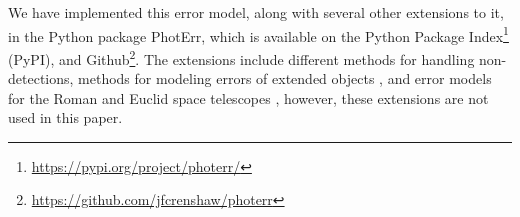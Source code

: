 \documentclass[twocolumn]{aastex631}
\begin{document}
We have implemented this error model, along with several other extensions to it, in the Python package PhotErr, which is available on the Python Package Index\footnote{\url{https://pypi.org/project/photerr/}} (PyPI), and Github\footnote{\url{https://github.com/jfcrenshaw/photerr}}.
The extensions include different methods for handling non-detections, methods for modeling errors of extended objects \citep{vandenbusch2020,kuijken2019}, and error models for the Roman and Euclid space telescopes \citep{roman,euclid,graham2020}, however, these extensions are not used in this paper.




\end{document}
